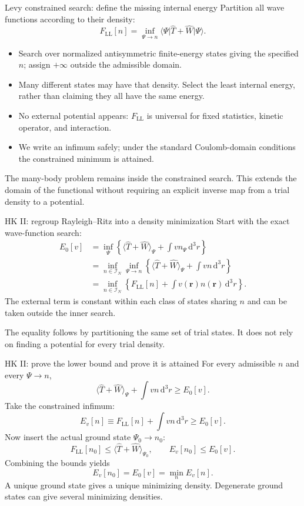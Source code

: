 \documentclass[aspectratio=169,10pt]{beamer}
\newcommand{\mbbox}[1]{\begin{tcolorbox}[colback=paleblue,colframe=uioblue,title={Many-body connection}]#1\end{tcolorbox}}
\newcommand{\dftbox}[1]{\begin{tcolorbox}[colback=paleteal,colframe=teal,title={Key result}]#1\end{tcolorbox}}
\newcommand{\dd}{\,\mathrm d}
\newcommand{\rr}{\mathbf r}
\newcommand{\ket}[1]{\lvert #1\rangle}
\newcommand{\bra}[1]{\langle #1\rvert}
\newcommand{\avg}[1]{\langle #1\rangle}
\newcommand{\LL}{\mathrm{LL}}
\begin{document}
\begin{frame}{Levy constrained search: define the missing internal energy}
Partition all wave functions according to their density:
\[
 \boxed{F_{\LL}[n]=\inf_{\Psi\to n}\bra\Psi\hat T+\hat W\ket\Psi.}
\]
\begin{itemize}
\item Search over normalized antisymmetric finite-energy states giving the
specified $n$; assign $+\infty$ outside the admissible domain.
\item Many different states may have that density. Select the least internal
energy, rather than claiming they all have the same energy.
\item No external potential appears: $F_{\LL}$ is universal for fixed
statistics, kinetic operator, and interaction.
\item We write an infimum safely; under the standard Coulomb-domain conditions
the constrained minimum is attained.
\end{itemize}
\mbbox{The many-body problem remains inside the constrained search. This
extends the domain of the functional without requiring an explicit inverse
map from a trial density to a potential.}
\end{frame}

\begin{frame}{HK II: regroup Rayleigh--Ritz into a density minimization}
Start with the exact wave-function search:
\begin{align*}
 E_0[v]
 &=\inf_\Psi\left\{\avg{\hat T+\hat W}_\Psi+\int v n_\Psi\dd^3r\right\}\\
 &=\inf_{n\in\mathcal I_N}\inf_{\Psi\to n}
       \left\{\avg{\hat T+\hat W}_\Psi+\int v n\dd^3r\right\}\\
 &=\boxed{\inf_{n\in\mathcal I_N}
       \left\{F_{\LL}[n]+\int v(\rr)n(\rr)\dd^3r\right\}.}
\end{align*}
The external term is constant within each class of states sharing $n$ and
can be taken outside the inner search.
\dftbox{The equality follows by partitioning the same set of trial states.
It does not rely on finding a potential for every trial density.}
\end{frame}

\begin{frame}{HK II: prove the lower bound and prove it is attained}
For every admissible $n$ and every $\Psi\to n$,
\[
 \avg{\hat T+\hat W}_\Psi+\int vn\dd^3r\geq E_0[v].
\]
Take the constrained infimum:
\[
 E_v[n]\equiv F_{\LL}[n]+\int vn\dd^3r\geq E_0[v].
\]
Now insert the actual ground state $\Psi_0\to n_0$:
\[
 F_{\LL}[n_0]\leq\avg{\hat T+\hat W}_{\Psi_0},\qquad E_v[n_0]\leq E_0[v].
\]
Combining the bounds yields
\[
 \boxed{E_v[n_0]=E_0[v]=\min_n E_v[n].}
\]
A unique ground state gives a unique minimizing density. Degenerate ground
states can give several minimizing densities.
\end{frame}
\end{document}
